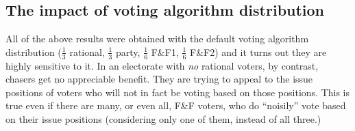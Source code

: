 \subsection{The impact of voting algorithm distribution}

All of the above results were obtained with the default voting algorithm
distribution ($\frac{1}{3}$ rational, $\frac{1}{3}$ party, $\frac{1}{6}$ F\&F1,
$\frac{1}{6}$ F\&F2) and it turns out they are highly sensitive to it. In an
electorate with \textit{no} rational voters, by contrast, chasers get no
appreciable benefit. They are trying to appeal to the issue positions of voters
who will not in fact be voting based on those positions. This is true even if
there are many, or even all, F\&F voters, who do ``noisily'' vote based on
their issue positions (considering only one of them, instead of all three.)












